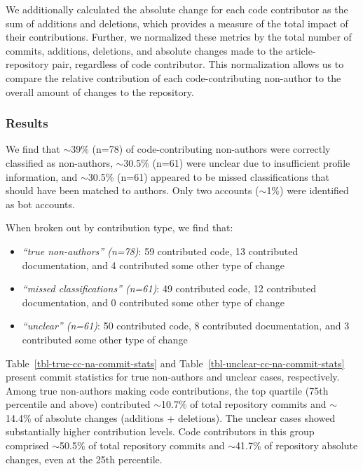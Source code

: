 \documentclass[
  letterpaper,
  DIV=11,
  numbers=noendperiod]{scrartcl}
\providecommand{\tightlist}{%
  \setlength{\itemsep}{0pt}\setlength{\parskip}{0pt}}
\begin{document}
We additionally calculated the absolute change for each code contributor
as the sum of additions and deletions, which provides a measure of the
total impact of their contributions. Further, we normalized these
metrics by the total number of commits, additions, deletions, and
absolute changes made to the article-repository pair, regardless of code
contributor. This normalization allows us to compare the relative
contribution of each code-contributing non-author to the overall amount
of changes to the repository.

\subsubsection{Results}\label{results}

We find that $\sim$39\% (n=78) of code-contributing non-authors
were correctly classified as non-authors, $\sim$30.5\% (n=61)
were unclear due to insufficient profile information, and
$\sim$30.5\% (n=61) appeared to be missed classifications that
should have been matched to authors. Only two accounts
($\sim$1\%) were identified as bot accounts.

When broken out by contribution type, we find that:

\begin{itemize}
\tightlist
\item
  \emph{``true non-authors'' (n=78)}: 59 contributed code, 13
  contributed documentation, and 4 contributed some other type of change
\item
  \emph{``missed classifications'' (n=61)}: 49 contributed code, 12
  contributed documentation, and 0 contributed some other type of change
\item
  \emph{``unclear'' (n=61)}: 50 contributed code, 8 contributed
  documentation, and 3 contributed some other type of change
\end{itemize}

Table~\ref{tbl-true-cc-na-commit-stats} and
Table~\ref{tbl-unclear-cc-na-commit-stats} present commit statistics for
true non-authors and unclear cases, respectively. Among true non-authors
making code contributions, the top quartile (75th percentile and above)
contributed $\sim$10.7\% of total repository commits and
$\sim$14.4\% of absolute changes (additions + deletions). The
unclear cases showed substantially higher contribution levels. Code
contributors in this group comprised $\sim$50.5\% of total
repository commits and $\sim$41.7\% of repository absolute
changes, even at the 25th percentile.
\end{document}
